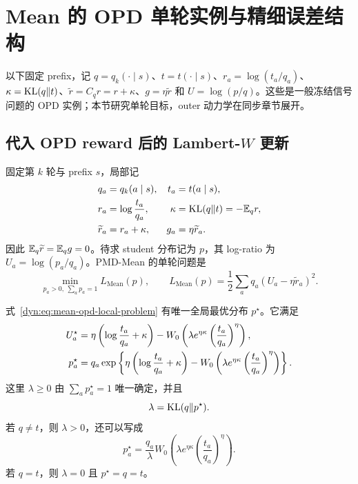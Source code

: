 \section{Mean 的 OPD 单轮实例与精细误差结构}
\label{dyn:mean-static}

以下固定 prefix，记 $q=q_k(\cdot\mid s)$、$t=t(\cdot\mid s)$、$r_a=\log(t_a/q_a)$、$\kappa=\operatorname{KL}(q\Vert t)$、$\widetilde r=C_qr=r+\kappa$、$g=\eta\widetilde r$ 和 $U=\log(p/q)$。这些是一般冻结信号问题的 OPD 实例；本节研究单轮目标，outer 动力学在同步章节展开。

\subsection{代入 OPD reward 后的 Lambert-$W$ 更新}

固定第 $k$ 轮与 prefix $s$，局部记
\begin{align}
 q_a&=q_k(a\mid s), & t_a&=t(a\mid s),\notag\\
 r_a&=\log\frac{t_a}{q_a}, &
 \kappa&=\operatorname{KL}(q\Vert t)=-\mathbb E_q r,\notag\\
 \widetilde r_a&=r_a+\kappa, & g_a&=\eta \widetilde r_a.
 \label{dyn:eq:mean-local-opd-definitions}
\end{align}
因此 $\mathbb E_q\widetilde r=\mathbb E_qg=0$。待求 student 分布记为 $p$，其 log-ratio 为 $U_a=\log(p_a/q_a)$。PMD-Mean 的单轮问题是
\begin{equation}
 \min_{p_a>0,\ \sum_a p_a=1}
 L_{\mathrm{Mean}}(p),
 \qquad
 L_{\mathrm{Mean}}(p)=\frac12\sum_aq_a(U_a-\eta \widetilde r_a)^2.
 \label{dyn:eq:mean-opd-local-problem}
\end{equation}

\begin{theorem}
\label{dyn:thm:mean-opd-explicit}
式~\eqref{dyn:eq:mean-opd-local-problem} 有唯一全局最优分布 $p^\star$。它满足
\begin{align}
 U_a^\star
 &=\eta\left(\log\frac{t_a}{q_a}+\kappa\right)
   -W_0\left(\lambda e^{\eta\kappa}
                      \left(\frac{t_a}{q_a}\right)^\eta\right),\notag\\
 p_a^\star
 &=q_a\exp\left\{\eta\left(\log\frac{t_a}{q_a}+\kappa\right)
   -W_0\left(\lambda e^{\eta\kappa}
                      \left(\frac{t_a}{q_a}\right)^\eta\right)\right\}.
 \label{dyn:eq:mean-opd-W-substituted}
\end{align}
这里 $\lambda\ge0$ 由 $\sum_a p_a^\star=1$ 唯一确定，并且
\begin{equation}
 \lambda=\operatorname{KL}(q\Vert p^\star).
 \label{dyn:eq:mean-opd-multiplier-kl}
\end{equation}
若 $q\ne t$，则 $\lambda>0$，还可以写成
\begin{equation}
 p_a^\star=\frac{q_a}{\lambda}
 W_0\left(\lambda e^{\eta\kappa}
                \left(\frac{t_a}{q_a}\right)^\eta\right).
 \label{dyn:eq:mean-opd-W-ratio}
\end{equation}
若 $q=t$，则 $\lambda=0$ 且 $p^\star=q=t$。
\end{theorem}

